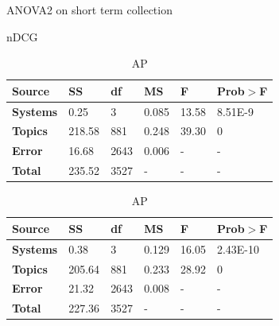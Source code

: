 \begin{table}[tbp]
     \caption{ANOVA2 on short term collection}
    \begin{subtable}[h]{1\textwidth}
        \centering
	 \caption{\ac{nDCG}}
        \begin{tabular}{|l|l|l|l|l|l|}
	\toprule
        \textbf{Source} & \textbf{SS} & \textbf{df} & \textbf{MS} & \textbf{F} & \textbf{Prob$>$F} \\
        \midrule
	\textbf{Systems} & 0.25 & 3  & 0.085  & 13.58  & 8.51E-9 \\
	\textbf{Topics}    & 218.58  & 881  & 0.248 & 39.30 & 0 \\
	\textbf{Error}   & 16.68 & 2643 & 0.006 & - & - \\
	\textbf{Total}   & 235.52  & 3527 & - & - & - \\
	\bottomrule
       \end{tabular}
    \end{subtable}
        \begin{subtable}[h]{1\textwidth}
        \centering
	\caption{\ac{AP}}
        \begin{tabular}{|l|l|l|l|l|l|}
	\toprule
        \textbf{Source} & \textbf{SS} & \textbf{df} & \textbf{MS} & \textbf{F} & \textbf{Prob$>$F} \\
        \midrule
	\textbf{Systems} & 0.38 & 3   & 0.129  & 16.05  & 2.43E-10 \\
	\textbf{Topics}    & 205.64  & 881  & 0.233 & 28.92 & 0 \\
	\textbf{Error}   & 21.32  & 2643 & 0.008 & - & - \\
	\textbf{Total}   & 227.36  & 3527 & - & - & - \\
	\bottomrule
       \end{tabular}
    \end{subtable}
     \label{tab:short-anova2}
\end{table}

